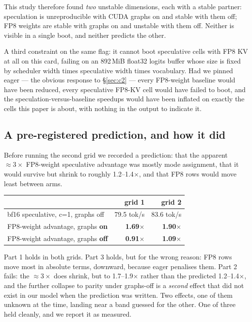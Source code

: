 \documentclass[11pt]{article}
\begin{document}
This study therefore found \emph{two} unstable dimensions, each with a stable
partner: speculation is unreproducible with CUDA graphs on and stable with them off;
FP8 weights are stable with graphs on and unstable with them off. Neither is
visible in a single boot, and neither predicts the other.

A third constraint on the same flag: it cannot boot speculative cells with
FP8 KV at all on this card, failing on an 892\,MiB float32 logits buffer
whose size is fixed by scheduler width times speculative width times
vocabulary. Had we pinned eager --- the obvious response to \S\ref{sec:c2}
--- every FP8-weight baseline would have been reduced, every speculative
FP8-KV cell would have failed to boot, and the speculation-versus-baseline
speedups would have been inflated on exactly the cells this paper is about,
with nothing in the output to indicate it.

\subsection{A pre-registered prediction, and how it did}

Before running the second grid we recorded a prediction: that the apparent
${\approx}3\times$ FP8-weight speculative advantage was mostly mode
assignment, that it would survive but shrink to roughly 1.2--1.4$\times$, and
that FP8 rows would move least between arms.

\begin{table}[h]\centering\small
\begin{tabular}{lrr}
\toprule
& grid 1 & grid 2\\
\midrule
bf16 speculative, c=1, graphs off & 79.5 tok/s & 83.6 tok/s\\
FP8-weight advantage, graphs \textbf{on} & \textbf{1.69$\times$} & \textbf{1.90$\times$}\\
FP8-weight advantage, graphs \textbf{off} & \textbf{0.91$\times$} & \textbf{1.09$\times$}\\
\bottomrule
\end{tabular}
\end{table}

\noindent
Part 1 holds in both grids. Part 3 holds, but for the wrong reason: FP8 rows
move most in absolute terms, downward, because eager penalises them. Part 2
fails: the ${\approx}3\times$ does shrink, but to 1.7--1.9$\times$ rather than
the predicted 1.2--1.4$\times$, and the further collapse to parity under
graphs-off is a \emph{second} effect that did not exist in our model when the
prediction was written. Two effects, one of them unknown at the time, landing
near a band guessed for the other. One of three held cleanly, and we report
it as measured.
\end{document}
